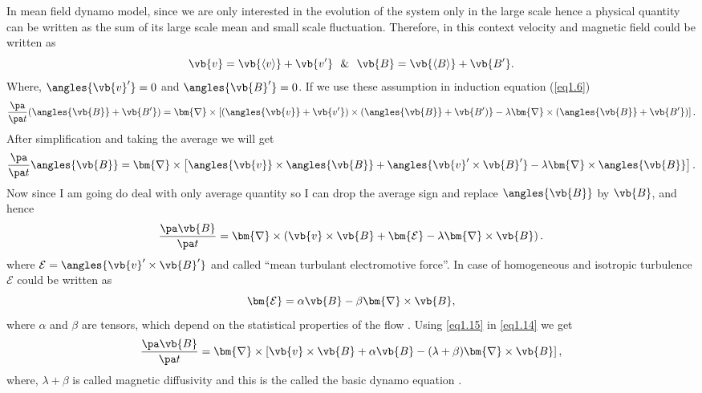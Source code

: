 In mean field dynamo model, since we are only interested in the evolution of the system only in the large scale hence a physical quantity can be written as the sum of its large scale mean and small scale fluctuation. Therefore, in this context velocity and magnetic field could be written as
\begin{equation}
    \vb{v}=\vb{\langle v\rangle}+\vb{v^\prime}~~\&~~\vb{B}=\vb{\langle B\rangle}+\vb{B^\prime}.
    \label{eq1.11}
\end{equation}
Where, $\angles{\vb{v}^\prime}=0$ and $\angles{\vb{B}^\prime}=0$. If we use these assumption in induction equation (\autoref{eq1.6})
\begin{equation}
    \frac{\pa}{\pa t}(\angles{\vb{B}}+\vb{B^\prime})=\bm{\nabla}\times\left[ (\angles{\vb{v}}+ \vb{v^\prime})\times (\angles{\vb{B}}+ \vb{B^\prime)} -\lambda\bm{\nabla}\times(\angles{\vb{B}}+\vb{B^\prime})\right].
    \label{eq1.12}
\end{equation}
After simplification and taking the average we will get
\begin{equation}
    \frac{\pa}{\pa t}\angles{\vb{B}}=\bm{\nabla}\times\left[\angles{\vb{v}}\times \angles{\vb{B}}+\angles{\vb{v}^\prime\times\vb{B}^\prime} -\lambda\bm{\nabla}\times\angles{\vb{B}}\right].
    \label{eq1.13}
\end{equation}
Now since I am going do deal with only average quantity so I can drop the average sign and replace $\angles{\vb{B}}$ by $\vb{B}$, and hence
\begin{equation}
    \frac{\pa \vb{B}}{\pa t}=\bm{\nabla}\times\left(\vb{v}\times \vb{B}+ \bm{\mathcal{E}} -\lambda\bm{\nabla}\times\vb{B}\right).
    \label{eq1.14}
\end{equation}
 where 
$\mathcal{E}=\angles{\vb{v}^\prime\times\vb{B}^\prime}$ and called ``mean turbulant electromotive force''. In case of homogeneous and isotropic turbulence $\mathcal{E}$ could be written as \citep{Choudhuri1998book, Charbonneau2010}
\begin{equation}
    \bm{\mathcal{E}}=\alpha \vb{B}-\beta\bm{\nabla}\times \vb{B},
    \label{eq1.15}
\end{equation}
where $\alpha$ and $\beta$ are tensors, which depend on the statistical properties of the flow \citep{Krause1980}. Using \autoref{eq1.15} in \autoref{eq1.14} we get
\begin{equation}
    \frac{\pa \vb{B}}{\pa t}=\bm{\nabla}\times\left[\vb{v}\times \vb{B}+ \alpha \vb{B} -(\lambda+\beta)\bm{\nabla}\times\vb{B}\right],
    \label{eq1.16}
\end{equation}
where, $\lambda+\beta$ is called magnetic diffusivity \citep{Charbonneau2010} and this is the called the basic dynamo equation \citep{Choudhuri1998book}.


